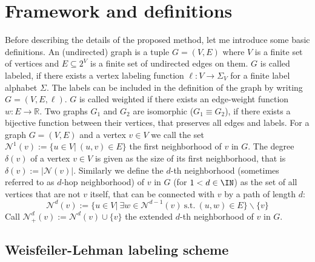 \section{Framework and definitions}\label{sec:definitions} %

Before describing the details of the proposed method, let me introduce some basic definitions. 
An (undirected) graph is a tuple $G = (V, E)$ where $V$ is a finite set of vertices and $E\subseteq 2^V$ is a finite set of undirected edges on them.
$G$ is called labeled, if there exists a vertex labeling function $\ell: V \to\Sigma_V$ for a finite label alphabet $\Sigma$.
The labels can be included in the definition of the graph by writing $G = (V, E, \ell)$. %
$G$ is called weighted if there exists an edge-weight function $w:E\to\mathbb{R}$.
Two graphs $G_1$ and $G_2$ are isomorphic ($G_1 \equiv G_2$), if there exists a bijective function between their vertices, that preserves all edges and labels.
For a graph $G = (V, E)$ and a vertex $v\in V$ we call the set $\mathcal{N}^1(v) := \{u \in V |\ (u, v) \in E\}$ the first neighborhood of $v$ in $G$.
The degree $\delta(v)$ of a vertex $v \in V$ is given as the size of its first neighborhood, that is $\delta(v):= |\mathcal{N}(v)|$.
Similarly we define the $d$-th neighborhood (sometimes referred to as $d$-hop neighborhood) of $v$ in $G$ (for $1<d\in\IN$) as the set of all vertices that are not $v$ itself, that can be connected with $v$ by a path of length $d$:
\[ \mathcal{N}^d(v) := \big\{u \in V |\ \exists w\in\mathcal{N}^{d-1}(v) \ \text{s.t.}\ (u, w) \in E\big\}\backslash\{v\} \]
Call $\mathcal{N}_+^d(v) := \mathcal{N}^d(v)\cup\{v\}$ the extended $d$-th neighborhood of $v$ in $G$. 

\subsection{Weisfeiler-Lehman labeling scheme}


